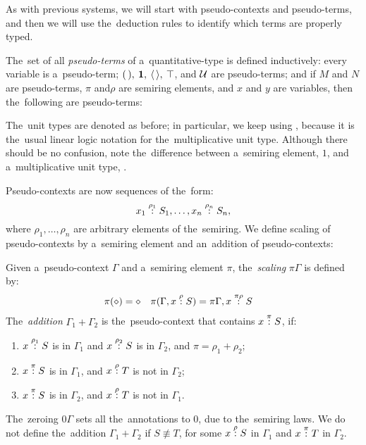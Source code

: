 
As with previous systems, we will start with pseudo-contexts and pseudo-terms,
and then we will use the~deduction rules to identify which terms are properly
typed.

\begin{definition}
  The~set of all \emph{pseudo-terms} of a~quantitative-type \lc is defined
  inductively: every variable is a~pseudo-term; $( \, ), \: \mathbf{1}, \: \langle \, \rangle,
  \: \top$, and $\mathcal{U}$ are pseudo-terms; and if $M$ and $N$ are pseudo-terms,
  $\pi$ and$ \rho$ are semiring elements, and $x$ and $y$ are variables, then
  the~following are pseudo-terms:
\end{definition}
The~unit types are denoted as before; in particular, we keep using \1, because
it is the~usual linear logic notation for the~multiplicative unit type. Although
there should be no confusion, note the~difference between a~semiring element,
$1$, and a~multiplicative unit type, \1.

Pseudo-contexts are now sequences of the~form:
\[
  x_1 \overset{\rho_1}: S_1, \dotsc, x_n \overset{\rho_n}: S_n,
\]
where $\rho_1, \dotsc, \rho_n$ are arbitrary elements of the~semiring. We define
scaling of pseudo-contexts by a~semiring element and an~addition of
pseudo-contexts:
\begin{definition}
  Given a~pseudo-context $\Gamma$ and a~semiring element $\pi$,
  the~\emph{scaling} $\pi\Gamma$ is defined by:
  \begin{align*}
    \pi (\diamond) = \diamond&  &  &\pi(\Gamma, x \overset{\rho}: S) = \pi\Gamma,
    x \overset{\pi\rho}: S
  \end{align*}
  The~\emph{addition} $\Gamma_1 + \Gamma_2$ is the~pseudo-context that contains
  $x \overset{\pi}: S$, if:
  \begin{enumerate}
    \item $x \overset{\rho_1}: S$ is in $\Gamma_1$ and $x \overset{\rho_2}: S$ is in
      $\Gamma_2$, and $\pi = \rho_1 + \rho_2$;
    \item $x \overset{\pi}: S$ is in $\Gamma_1$, and $x \overset{\rho}: T$ is not in $\Gamma_2$;
    \item $x \overset{\pi}: S$ is in $\Gamma_2$, and $x \overset{\rho}: T$ is not in $\Gamma_1$.
  \end{enumerate}
\end{definition}
The~zeroing $0\Gamma$ sets all the~annotations to $0$, due to the~semiring laws.
We do not define the~addition $\Gamma_1 + \Gamma_2$ if $S \not\equiv T$, for
some $x \overset{\rho}: S$ in $\Gamma_1$ and $x \overset{\pi}: T$ in $\Gamma_2$.

